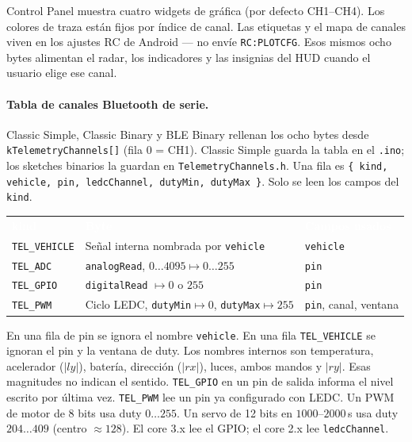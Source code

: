 \documentclass[12pt,a4paper]{article}
\newcommand{\thc}[1]{\textcolor{white}{\bfseries #1}}
\begin{document}
Control Panel muestra cuatro widgets de gráfica (por defecto CH1--CH4).
Los colores de traza están fijos por índice de canal. Las etiquetas y el
mapa de canales viven en los ajustes RC de Android --- no envíe
\texttt{RC:PLOTCFG}. Esos mismos ocho bytes alimentan el radar, los
indicadores y las insignias del HUD cuando el usuario elige ese canal.

\paragraph{Tabla de canales Bluetooth de serie.}
Classic Simple, Classic Binary y BLE Binary rellenan los ocho bytes desde
\texttt{kTelemetryChannels[]} (fila 0 = CH1). Classic Simple guarda la tabla
en el \texttt{.ino}; los sketches binarios la guardan en
\texttt{TelemetryChannels.h}.
Una fila es \texttt{\{ kind, vehicle, pin, ledcChannel, dutyMin, dutyMax \}}.
Solo se leen los campos del \texttt{kind}.

\begin{center}
\renewcommand{\arraystretch}{1.25}
\setlength{\tabcolsep}{4pt}
\begin{tabular}{>{\raggedright\arraybackslash}p{2.6cm}
                >{\raggedright\arraybackslash}p{6.2cm}
                >{\raggedright\arraybackslash}p{4.6cm}}
\rowcolor{TblHead}
\thc{kind} & \thc{Byte} & \thc{Campos usados} \\
\rowcolor{TblChan}
\texttt{TEL\_VEHICLE} & Señal interna nombrada por \texttt{vehicle} & \texttt{vehicle} \\
\rowcolor{TblTelem}
\texttt{TEL\_ADC} & \texttt{analogRead}, $0\ldots 4095 \mapsto 0\ldots 255$ & \texttt{pin} \\
\rowcolor{TblSw}
\texttt{TEL\_GPIO} & \texttt{digitalRead} $\mapsto 0$ o $255$ & \texttt{pin} \\
\rowcolor{TblKnob}
\texttt{TEL\_PWM} & Ciclo LEDC, \texttt{dutyMin}$\mapsto 0$, \texttt{dutyMax}$\mapsto 255$ & \texttt{pin}, canal, ventana \\
\end{tabular}
\end{center}

En una fila de pin se ignora el nombre \texttt{vehicle}. En una fila
\texttt{TEL\_VEHICLE} se ignoran el pin y la ventana de duty. Los nombres
internos son temperatura, acelerador ($\lvert ly\rvert$), batería, dirección
($\lvert rx\rvert$), luces, ambos mandos y $\lvert ry\rvert$. Esas magnitudes
no indican el sentido. \texttt{TEL\_GPIO} en un pin de salida informa el
nivel escrito por última vez. \texttt{TEL\_PWM} lee un pin ya configurado
con LEDC. Un PWM de motor de 8 bits usa duty $0\ldots 255$. Un servo de
12 bits en $1000$--$2000$\,\textmu s usa duty $204\ldots 409$ (centro
$\approx 128$). El core 3.x lee el GPIO; el core 2.x lee
\texttt{ledcChannel}.
\end{document}
